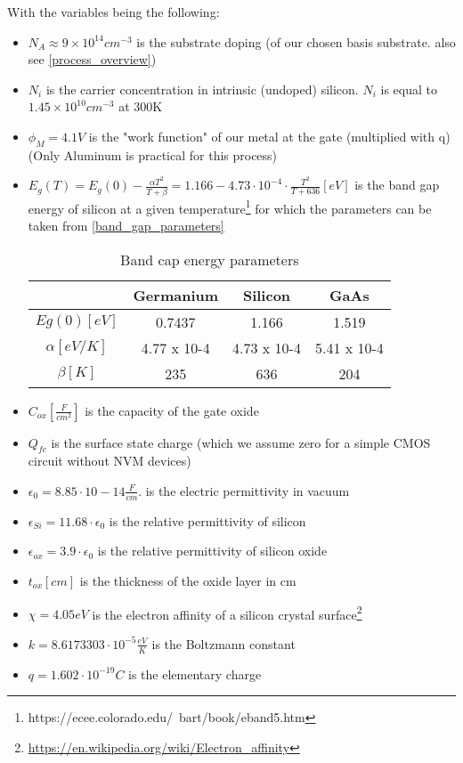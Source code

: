 With the variables being the following:
\begin{itemize}
\item $N_A \approx 9\times10^{14}cm^{-3}$ is the substrate doping (of our chosen basis substrate. also see \autoref{process_overview})
\item $N_i$ is the carrier concentration in intrinsic (undoped) silicon. $N_i$ is equal to $1.45 \times 10^{10} cm^{-3}$ at 300\degree K
\item $\phi_M = 4.1 V$ is the "work function" of our metal at the gate (multiplied with q) (Only Aluminum is practical for this process)
\item $E_g(T) = E_g(0) - \frac{\alpha T^2}{T+\beta} = 1.166 - 4.73 \cdot 10^{-4} \cdot \frac{T^2}{T+636} [eV]$ is the band gap energy of silicon at a given temperature\footnote{https://ecee.colorado.edu/~bart/book/eband5.htm} for which the parameters can be taken from \autoref{band_gap_parameters}
\begin{table}[H]
\centering
\begin{tabular}{|c|c|c|c|}
\hline
{} &
\textbf{Germanium} &
\textbf{Silicon} &
\textbf{GaAs} \\
\hline
$Eg(0) [eV]$ &
0.7437 &
1.166 &
1.519 \\
\hline
$\alpha [eV/K]$ &
4.77 x 10-4 &
4.73 x 10-4 &
5.41 x 10-4 \\
\hline
$\beta [K]$ &
235 &
636 &
204 \\
\hline
\end{tabular}
\caption{Band cap energy parameters}
\label{band_gap_parameters}
\end{table}
\item $C_{ox} \left[\frac{F}{cm^2}\right]$ is the capacity of the gate oxide
\item $Q_{fc}$ is the surface state charge (which we assume zero for a simple CMOS circuit without NVM devices)
\item $\epsilon_0 = 8.85 \cdot 10−14 \frac{F}{cm}. $ is the electric permittivity in vacuum
\item $\epsilon_{Si} =11.68 \cdot \epsilon_0$ is the relative permittivity of silicon
\item $\epsilon_{ox} = 3.9 \cdot \epsilon_0$ is the relative permittivity of silicon oxide
\item $t_{ox} [cm]$ is the thickness of the oxide layer in cm
\item $\chi = 4.05 eV$ is the electron affinity of a silicon crystal surface\footnote{\url{https://en.wikipedia.org/wiki/Electron_affinity}}
\item $k=8.6173303 \cdot 10^{-5} \frac{eV}{K}$ is the Boltzmann constant
\item $q=1.602 \cdot 10^{-19} C$ is the elementary charge
\end{itemize}